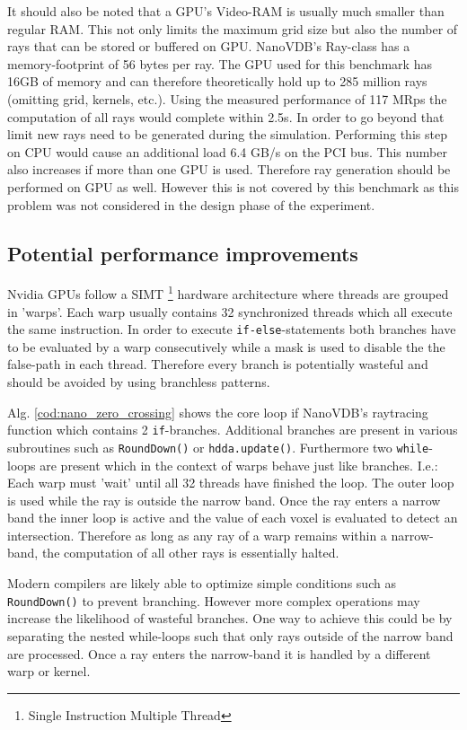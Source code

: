 It should also be noted that a GPU's Video-RAM is usually much smaller than regular RAM.
This not only limits the maximum grid size but also the number of rays that can be stored or buffered on GPU.
NanoVDB's Ray-class has a memory-footprint of 56 bytes per ray.
The GPU used for this benchmark has 16GB of memory and can therefore theoretically hold up to 285 million rays (omitting grid, kernels, etc.).
Using the measured performance of 117 MRps the computation of all rays would complete within 2.5s.
In order to go beyond that limit new rays need to be generated during the simulation.
Performing this step on CPU would cause an additional load 6.4 GB/s on the PCI bus.
This number also increases if more than one GPU is used.
Therefore ray generation should be performed on GPU as well.
However this is not covered by this benchmark as this problem was not considered in the design phase of the experiment.

\subsection{Potential performance improvements}
Nvidia GPUs follow a SIMT \footnote{Single Instruction Multiple Thread} hardware architecture where threads are grouped in 'warps'.
Each warp usually contains 32 synchronized threads which all execute the same instruction.
In order to execute \texttt{if-else}-statements both branches have to be evaluated by a warp consecutively while a mask is used to disable the the false-path in each thread. \cite[Chapter~3.6.3]{mccool}
Therefore every branch is potentially wasteful and should be avoided by using branchless patterns.


Alg. \ref{cod:nano_zero_crossing} shows the core loop if NanoVDB's raytracing function which contains 2 \texttt{if}-branches.
Additional branches are present in various subroutines such as \texttt{RoundDown()} or \texttt{hdda.update()}.
Furthermore two \texttt{while}-loops are present which in the context of warps behave just like branches.
I.e.: Each warp must 'wait' until all 32 threads have finished the loop.
The outer loop is used while the ray is outside the narrow band. Once the ray enters a narrow band the inner loop is active and the value of each voxel is evaluated to detect an intersection.
Therefore as long as any ray of a warp remains within a narrow-band, the computation of all other rays is essentially halted.

Modern compilers are likely able to optimize simple conditions such as \texttt{RoundDown()} to prevent branching.
However more complex operations may increase the likelihood of wasteful branches.
One way to achieve this could be by separating the nested while-loops such that only rays outside of the narrow band are processed.
Once a ray enters the narrow-band it is handled by a different warp or kernel.

